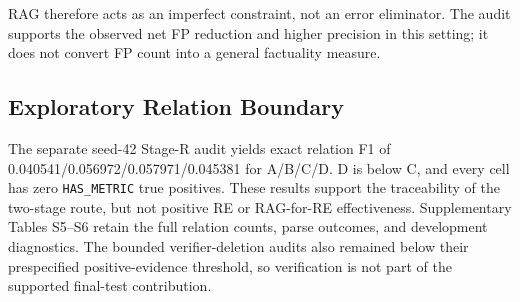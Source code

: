 RAG therefore acts as an imperfect constraint, not an error eliminator. The
audit supports the observed net FP reduction and higher precision in this
setting; it does not convert FP count into a general factuality measure.

\subsection{Exploratory Relation Boundary}

The separate seed-42 Stage-R audit yields exact relation F1 of
0.040541/0.056972/0.057971/0.045381 for A/B/C/D. D is below C, and every cell
has zero \texttt{HAS\_METRIC} true positives. These results support the
traceability of the two-stage route, but not positive RE or RAG-for-RE
effectiveness. Supplementary Tables S5--S6 retain the full relation counts,
parse outcomes, and development diagnostics. The bounded verifier-deletion
audits also remained below their prespecified positive-evidence threshold, so
verification is not part of the supported final-test contribution.
